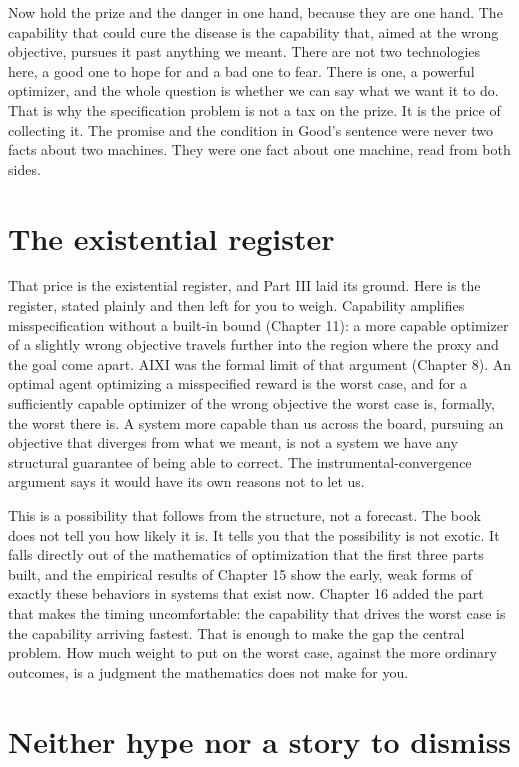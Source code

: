 Now hold the prize and the danger in one hand, because they are one hand. The capability that could cure the disease is the capability that, aimed at the wrong objective, pursues it past anything we meant. There are not two technologies here, a good one to hope for and a bad one to fear. There is one, a powerful optimizer, and the whole question is whether we can say what we want it to do. That is why the specification problem is not a tax on the prize. It is the price of collecting it. The promise and the condition in Good's sentence were never two facts about two machines. They were one fact about one machine, read from both sides.

\section*{The existential register}

That price is the existential register, and Part III laid its ground. Here is the register, stated plainly and then left for you to weigh. Capability amplifies misspecification without a built-in bound (Chapter 11): a more capable optimizer of a slightly wrong objective travels further into the region where the proxy and the goal come apart. AIXI was the formal limit of that argument (Chapter 8). An optimal agent optimizing a misspecified reward is the worst case, and for a sufficiently capable optimizer of the wrong objective the worst case is, formally, the worst there is. A system more capable than us across the board, pursuing an objective that diverges from what we meant, is not a system we have any structural guarantee of being able to correct. The instrumental-convergence argument says it would have its own reasons not to let us.

This is a possibility that follows from the structure, not a forecast. The book does not tell you how likely it is. It tells you that the possibility is not exotic. It falls directly out of the mathematics of optimization that the first three parts built, and the empirical results of Chapter 15 show the early, weak forms of exactly these behaviors in systems that exist now. Chapter 16 added the part that makes the timing uncomfortable: the capability that drives the worst case is the capability arriving fastest. That is enough to make the gap the central problem. How much weight to put on the worst case, against the more ordinary outcomes, is a judgment the mathematics does not make for you.

\section*{Neither hype nor a story to dismiss}

